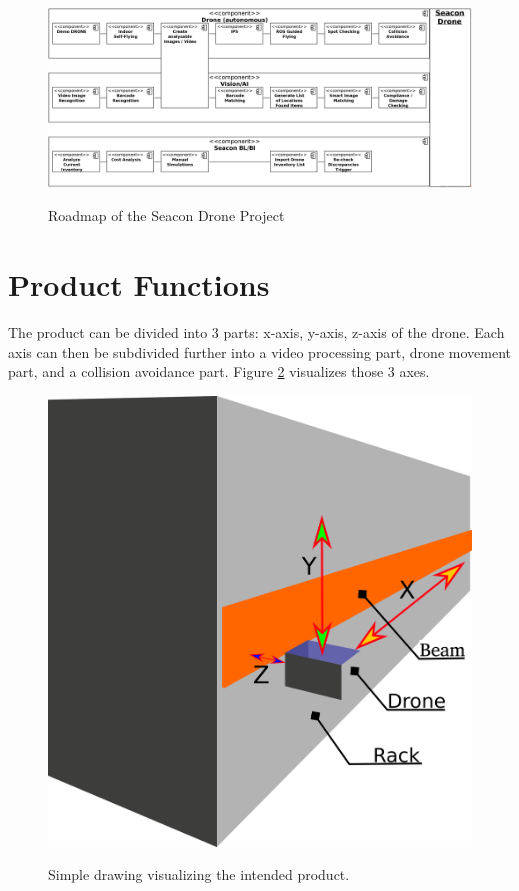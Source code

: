 \begin{figure}[ht]
	\centering
	\includegraphics[width=\linewidth]{img/seacon_roadmap.png}
	\label{fig:roadmap}
	\caption{Roadmap of the Seacon Drone Project}
\end{figure}
\pagebreak
\section{Product Functions}
The product can be divided into 3 parts: x-axis, y-axis, z-axis of the drone. Each axis can then be subdivided further into a video processing part, drone movement part, and a collision avoidance part. Figure \ref{fig:drone_concept} visualizes those 3 axes.
\begin{figure}[h]
	\centering
	\includegraphics[width=\linewidth/2]{img/drone_concept_diagram.png}
	\label{fig:drone_concept}
	\caption{Simple drawing visualizing the intended product.}
\end{figure}
